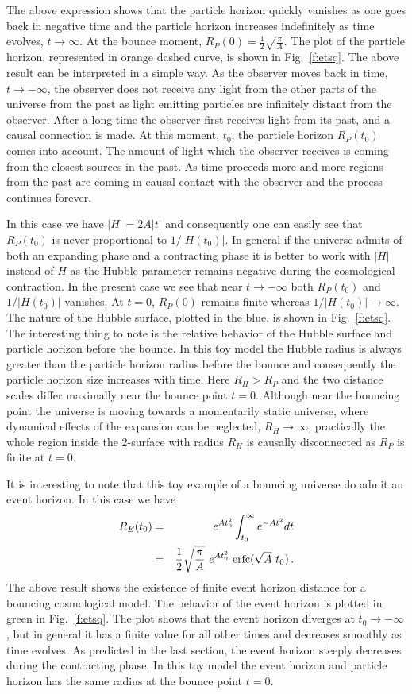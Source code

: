 \documentclass[24pt]{article}
\begin{document}
The above expression shows that the particle horizon quickly vanishes
as one goes back in negative time and the particle horizon
increases indefinitely as time evolves, $t \to \infty$. At the bounce
moment, $R_P(0)=\frac12\sqrt{\frac{\pi}{A}}$. The plot of the particle
horizon, represented in orange dashed curve, is shown in Fig.~\ref{f:etsq}. The
above result can be interpreted in a simple way. As the observer moves
back in time, $t \to -\infty$, the observer does not receive any light
from the other parts of the universe from the past as light emitting
particles are infinitely distant from the observer. After a long time
the observer first receives light from its past, and a causal
connection is made. At this moment, $t_0$, the particle horizon
$R_P(t_0)$ comes into account. The amount of light which the observer
receives is coming from the closest sources in the past. As time
proceeds more and more regions from the past are coming in causal
contact with the observer and the process continues forever.

In this case we have $|H|=2A|t|$ and consequently one can easily see
that $R_P(t_0)$ is never proportional to $1/|H(t_0)|$. In general if
the universe admits of both an expanding phase and a contracting phase
it is better to work with $|H|$ instead of $H$ as the Hubble parameter
remains negative during the cosmological contraction. In the present
case we see that near $t\to -\infty$ both $R_P(t_0)$ and $1/|H(t_0)|$
vanishes. At $t=0$, $R_P(0)$ remains finite whereas $1/|H(t_0)| \to
\infty$. The nature of the Hubble surface, plotted in the blue, is
shown in Fig.~\ref{f:etsq}.  The interesting thing to note is the
relative behavior of the Hubble surface and particle horizon before
the bounce. In this toy model the Hubble  radius is always
greater than the particle horizon radius before the bounce and
consequently the particle horizon size increases with time.  Here $R_H
> R_P$ and the two distance scales differ maximally near the bounce
point $t=0$. Although near the bouncing point the universe is moving
towards a momentarily static universe, where dynamical effects of the
expansion can be neglected, $R_H \to \infty$, practically the whole
region inside the 2-surface with radius $R_H$ is causally disconnected
as $R_P$ is finite at $t=0$.

It is interesting to note that this toy example of a bouncing universe
do admit an event horizon. In this case we have
\begin{eqnarray}
R_E(t_0) &=& e^{A t_0^2} \int_{t_0}^{\infty} e^{-A t^2}
dt\nonumber\\ &=& \frac{1}{2}\sqrt{\frac{\pi}{A}}\,\, e^{A t_0^2}
\,\,{\rm erfc}(\sqrt{A}\,\,t_0)\,.
\label{cas1e}
\end{eqnarray}
The above result shows the existence of finite event horizon distance
for a bouncing cosmological model. The behavior of the event horizon
is plotted in green in Fig.~\ref{f:etsq}. The plot shows that the
event horizon diverges at $t_0 \to -\infty$, but in general it has a
finite value for all other times and decreases smoothly as time
evolves. As predicted in the last section, the event horizon steeply
decreases during the contracting phase. In this toy model the event
horizon and particle horizon has the same radius at the bounce point
$t=0$.
\end{document}
